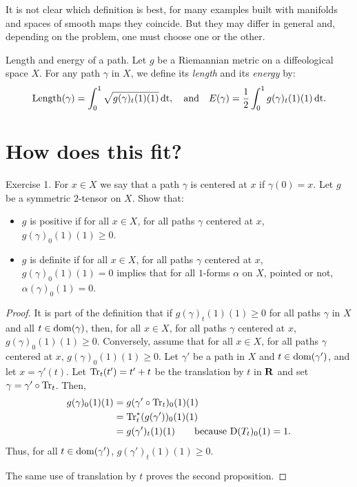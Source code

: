 It is not clear which definition is best,
for many examples built with manifolds and spaces of smooth maps they coincide.
But they may differ in general and, depending on the problem, one must choose one or the other.

\begin{Article}{Length and energy of a path.}{}
  Let $g$ be a Riemannian metric on a diffeological space $X$.
  For any path $\gamma$ in $X$,
  we define its \emph{length} and its \emph{energy} by:
  $$
    \mathrm{Length}(\gamma) = \int_0^1 \sqrt{g(\gamma)_t(1)(1)} \,\mathrm{dt},
    \quad \text{and} \quad
    E(\gamma) = {1\over 2} \int_0^1 g(\gamma)_t(1)(1) \,\mathrm{dt}.
    $$
\end{Article}

\section{How does this fit?}

\begin{Article}{Exercise 1.}{}
  For $x \in X$ we say that a path $\gamma$ is centered at $x$ if $\gamma(0) = x$.
  Let $g$ be a symmetric $2$-tensor on $X$.
  Show that:
  
  \begin{itemize}
    \item $g$ is positive if for all $x \in X$,
    for all paths $\gamma$ centered at $x$,
    $g(\gamma)_0(1)(1) \geq 0$.
    
    \item $g$ is definite if for all $x \in X$,
    for all paths $\gamma$ centered at $x$,
    $g(\gamma)_0(1)(1) = 0$ implies that for all $1$-forms $\alpha$ on $X$,
    pointed or not,
    $\alpha(\gamma)_0(1) = 0$.
  \end{itemize}
\end{Article}

\begin{proof}
  It is part of the definition that if $g(\gamma)_t(1)(1) \geq 0$ for all paths $\gamma$ in $X$ and all $t \in \mathrm{dom}(\gamma)$,
  then,
  for all $x \in X$,
  for all paths $\gamma$ centered at $x$,
  $g(\gamma)_0(1)(1) \geq 0$.
  Conversely,
  assume that for all $x \in X$,
  for all paths $\gamma$ centered at $x$,
  $g(\gamma)_0(1)(1) \geq 0$.
  Let $\gamma'$ be a path in $X$ and $t \in \mathrm{dom}(\gamma')$,
  and let $x = \gamma'(t)$.
  Let $\operatorname{Tr}_{t}(t') = t' + t$ be the translation by $t$ in $\mathbf{R}$ and set $\gamma = \gamma' \circ \operatorname{Tr}_{t}$.
  Then,
  \begin{align*}
    g(\gamma)_0(1)(1) & = g(\gamma' \circ \operatorname{Tr}_{t})_0(1)(1) \\
    & = \operatorname{Tr}_{t}^*(g(\gamma'))_0(1)(1) \\
    & = g(\gamma')_t(1)(1) \qquad \text{because $\operatorname{D}(T_t)_0(1) = 1$.}
  \end{align*}
  Thus,
  for all $t \in \mathrm{dom}(\gamma')$,
  $g(\gamma')_t(1)(1) \geq 0$.
  
  The same use of translation by $t$ proves the second proposition.
\end{proof}

